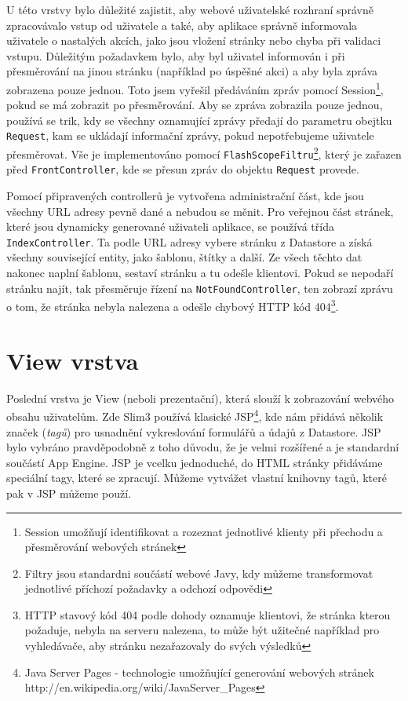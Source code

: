U této vrstvy bylo důležité zajistit, aby webové uživatelské rozhraní správně zpracovávalo vstup od uživatele a také, aby aplikace správně informovala uživatele o nastalých akcích, jako jsou vložení stránky nebo chyba při validaci vstupu. Důležitým požadavkem bylo, aby byl uživatel informován i při přesměrování na jinou stránku (například po úspěšné akci) a aby byla zpráva zobrazena pouze jednou. Toto jsem vyřešil předáváním zpráv pomocí Session\footnote{Session umožňují identifikovat a rozeznat jednotlivé klienty při přechodu a přesměrování webových stránek}, pokud se má zobrazit po přesměrování. Aby se zpráva zobrazila pouze jednou, používá se trik, kdy se všechny oznamující zprávy předají do parametru obejtku \verb|Request|, kam se ukládají informační zprávy, pokud nepotřebujeme uživatele přesměrovat. Vše je implementováno pomocí \verb|FlashScopeFiltru|\footnote{Filtry jsou standardni součástí webové Javy, kdy můžeme transformovat jednotlivé příchozí požadavky a odchozí odpovědi}, který je zařazen před \verb|FrontController|, kde se přesun zpráv do objektu \verb|Request| provede.

Pomocí připravených controllerů je vytvořena administrační část, kde jsou všechny URL adresy pevně dané a nebudou se měnit. Pro veřejnou část stránek, které jsou dynamicky generované uživateli aplikace, se používá třída \verb|IndexController|. Ta podle URL adresy vybere stránku z Datastore a získá všechny související entity, jako šablonu, štítky a další. Ze všech těchto dat nakonec naplní šablonu, sestaví stránku a tu odešle klientovi. Pokud se nepodaří stránku najít, tak přesměruje řízení na \verb|NotFoundController|, ten zobrazí zprávu o tom, že stránka nebyla nalezena a odešle chybový HTTP kód 404\footnote{HTTP stavový kód 404 podle dohody oznamuje klientovi, že stránka kterou požaduje, nebyla na serveru nalezena, to může být užitečné například pro vyhledávače, aby stránku nezařazovaly do svých výsledků}.

\section{View vrstva}
Poslední vrstva je View (neboli prezentační), která slouží k zobrazování webvého obsahu uživatelům. Zde Slim3 používá klasické JSP\footnote{Java Server Pages - technologie umožňující generování webových stránek http://en.wikipedia.org/wiki/JavaServer\_Pages}, kde nám přidává několik značek (\emph{tagů}) pro usnadnění vykreslování formulářů a údajů z Datastore. JSP bylo vybráno pravděpodobně z toho důvodu, že je velmi rozšířené a je standardní součástí App Engine. JSP je vcelku jednoduché, do HTML stránky přidáváme speciální tagy, které se zpracují. Můžeme vytvážet vlastní knihovny tagů, které pak v JSP můžeme použí.